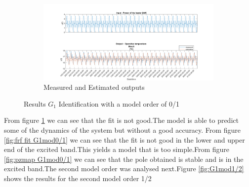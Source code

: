 \documentclass[a4paper,12pt]{article}
\numberwithin{equation}{section}
\begin{document}
\begin{figure}[H]
\begin{subfigure}{\textwidth}
  \centering
  \includegraphics[scale=0.38]{G1mod01InOut.png}
  \caption{Measured and Estimated outputs}
  \label{fig:inoutG10/1}
\end{subfigure}
\caption{Results $G_{1}$ Identification with a model order of 0/1 }
\label{fig:G1mod0/1}
\end{figure}

\noindent
From figure \ref{fig:inoutG10/1} we can see that the fit is not good.The model is able to predict some of the dynamics of the system but without a good accuracy. From figure \ref{fig:frf fit G1mod0/1} we can see that the fit is not good in the lower and upper end of the excited band.This yields a model that is too simple.From figure \ref{fig:pzmap G1mod0/1} we can see that the pole obtained is stable and is in the excited band.The second model order was analysed next.Figure \ref{fig:G1mod1/2} shows the results for the second model order 1/2 
\end{document}
